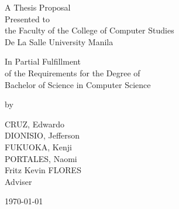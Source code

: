 %
%
%                 

\begin{titlepage}
\centering



\vspace{1.75cm}
A Thesis Proposal\\
Presented to\\
the Faculty of the College of Computer Studies\\
De La Salle University Manila

\vspace{1.75cm}
In Partial Fulfillment\\
of the Requirements for the Degree of\\
Bachelor of  Science in Computer Science

\vspace{1.75cm}
by\\
\vspace{1cm}

CRUZ, Edwardo \\
DIONISIO, Jefferson  \\
FUKUOKA, Kenji  \\
PORTALES, Naomi  \\

\vspace{1.75cm}
Fritz Kevin FLORES \\
Adviser

\vspace{1.75cm}
\today
\end{titlepage}

